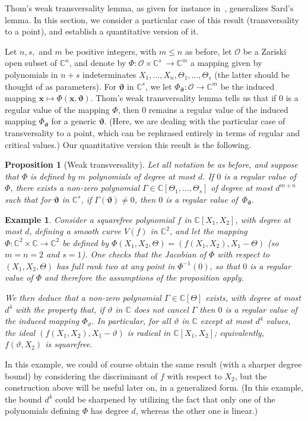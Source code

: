 \documentclass[12pt]{article}
\def\thetab{\bm{\vartheta}}
\def\xb{{\bm x}}
\def\vt{\vartheta}
\def\dt{s}
\def\C{\mathbb{C}}
\newtheorem{ex}[theorem]{Example}
\newtheorem{prop}[theorem]{Proposition}
\begin{document}
Thom's weak transversality lemma, as given for instance
in~\cite{demazure2000bifurcations}, generalizes Sard's lemma. In this
section, we consider a particular case of this result (transversality
to a point), and establish a quantitative version of it.

Let $n,\dt,$ and $m$ be positive integers, with $m \le n$ as before,
let $\mathscr{O}$ be a Zariski open subset of $\C^n$, and denote by
$\Phi: \mathscr{O} \times \C^{\dt} ~ \rightarrow \C^{m}$ a mapping
given by polynomials in $n+\dt$ indeterminates
$X_1,\dots,X_n,\Theta_1,\dots,\Theta_\dt$ (the latter should be
thought of as parameters). For $\thetab$ in $\C^{\dt}$, we let
$\Phi_{\thetab} : \mathscr{O} \rightarrow \C^{m}$ be the induced
mapping $\xb\mapsto\Phi(\xb,\thetab)$.  Thom's weak transversality
lemma tells us that if $0$ is a regular value of the mapping $\Phi$,
then $0$ remains a regular value of the induced mapping $\Phi_{\bm
  \vt}$ for a generic $\bm \vt$. (Here, we are dealing with the
particular case of transversality to a point, which can be rephrased
entirely in terms of regular and critical values.)  Our quantitative
version this result is the following.

\begin{prop} [Weak transversality]\label{prop:weak_t}
  Let all notation be as before, and suppose that $\Phi$ is defined by
  $m$ polynomials of degree at most $d$. If $0$ is a regular value of
  $\Phi$, there exists a non-zero polynomial $\Gamma \in
  \C[\Theta_1,\dots,\Theta_s]$ of degree at most $d^{m+n}$ such that
  for $\thetab$ in $\C^\dt$, if $\Gamma(\thetab)\ne 0$, then $0$ is a
  regular value of~$\Phi_{\thetab}$.
\end{prop}
\begin{ex}
  Consider a squarefree polynomial $f$ in $\C[X_1,X_2]$, with degree
  at most $d$, defining a smooth curve $V(f)$ in $\C^2$, and let the
  mapping $\Phi:\C^2\times \C \to \C^2$ be defined by
  $\Phi(X_1,X_2,\Theta) = (f(X_1,X_2), X_1-\Theta)$ (so $m=n=2$ and
  $s=1$). One checks that the Jacobian of $\Phi$ with respect to
  $(X_1,X_2,\Theta)$ has full rank two at any point in $\Phi^{-1}(0)$,
  so that $0$ is a regular value of $ \Phi$ and therefore the
  assumptions of the proposition apply.

  We then deduce that a non-zero polynomial $\Gamma \in \C[\Theta]$
  exists, with degree at most $d^{4}$ with the property that, if
  $\vartheta$ in $\C$ does not cancel $\Gamma$ then $0$ is a regular
  value of the induced mapping $ \Phi_{\vartheta}$. In particular, for
  all $\vartheta$ in $\C$ except at most $d^4$ values, the ideal
  $(f(X_1,X_2), X_1-\vartheta)$ is radical in $\C[X_1,X_2]$;
  equivalently, $f(\vartheta, X_2)$ is squarefree.
\end{ex}
In this example, we could of course obtain the same result (with a
sharper degree bound) by considering the discriminant of $f$ with
respect to $X_2$, but the construction above will be useful later on,
in a generalized form. (In this example, the bound $d^4$ could be
sharpened by utilizing the fact that only one of the polynomials
defining $\Phi$ has degree $d$, whereas the other one is linear.)
\end{document}
